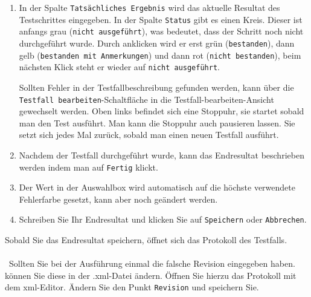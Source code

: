 \documentclass[11pt,a4paper,titlepage]{article}
\begin{document}
\begin{enumerate}
\item In der Spalte \texttt{Tatsächliches Ergebnis} wird das aktuelle Resultat des Testschrittes eingegeben.
In der Spalte \texttt{Status} gibt es einen Kreis.
Dieser ist anfangs grau (\texttt{nicht ausgeführt}), was bedeutet, dass der Schritt noch nicht durchgeführt wurde. Durch anklicken wird er erst grün (\texttt{bestanden}), 
dann gelb (\texttt{bestanden mit Anmerkungen}) und dann rot (\texttt{nicht bestanden}), beim nächsten Klick steht er wieder auf \texttt{nicht ausgeführt}.

Sollten Fehler in der Testfallbeschreibung gefunden werden, kann über die \texttt{Testfall bearbeiten}-Schaltfläche in die Testfall-bearbeiten-Ansicht gewechselt werden.
Oben links befindet sich eine Stoppuhr, sie startet sobald man den Test ausführt. Man kann die Stoppuhr auch pausieren lassen.
Sie setzt sich jedes Mal zurück, sobald man einen neuen Testfall ausführt. 

\item Nachdem der Testfall durchgeführt wurde, kann das Endresultat beschrieben werden indem man auf \texttt{Fertig} klickt.
\item Der Wert in der Auswahlbox wird automatisch auf die höchste verwendete Fehlerfarbe gesetzt, kann aber noch geändert werden.
\item Schreiben Sie Ihr Endresultat und klicken Sie auf \texttt{Speichern} oder \texttt{Abbrechen}.
\end{enumerate}
Sobald Sie das Endresultat speichern, öffnet sich das Protokoll des Testfalls.\\
\\\
Sollten Sie bei der Ausführung einmal die falsche Revision eingegeben haben. können Sie diese in der .xml-Datei ändern.
Öffnen Sie hierzu das Protokoll mit dem xml-Editor. Ändern Sie den Punkt \texttt{Revision} und speichern Sie. 
\end{document}
